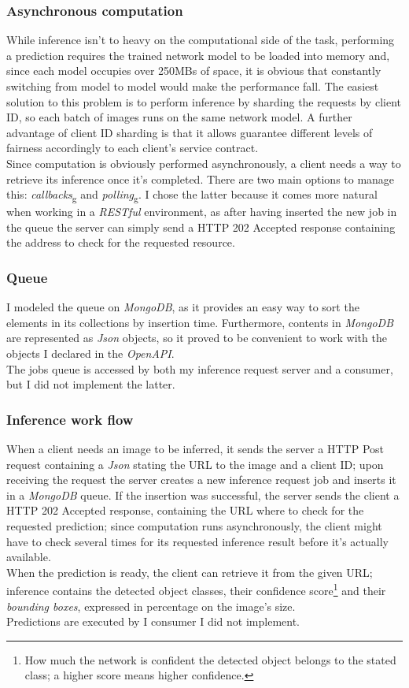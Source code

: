\subsubsection{Asynchronous computation}
While inference isn't to heavy on the computational side of the task, performing a prediction requires the trained network model to be loaded into memory and, since each model occupies over 250MBs of space, it is obvious that constantly switching from model to model would make the performance fall. The easiest solution to this problem is to perform inference by sharding the requests by client ID, so each batch of images runs on the same network model. A further advantage of client ID sharding is that it allows guarantee different levels of fairness accordingly to each client's service contract. \\
Since computation is obviously performed asynchronously, a client needs a way to retrieve its inference once it's completed. There are two main options to manage this: \emph{\gls{callback}s}\textsubscript{g} and \emph{\gls{polling}}\textsubscript{g}. I chose the latter because it comes more natural when working in a \emph{RESTful} environment, as after having inserted the new job in the queue the server can simply send a HTTP 202 Accepted response containing the address to check for the requested resource.

\subsubsection{Queue}
I modeled the queue on \emph{MongoDB}, as it provides an easy way to sort the elements in its collections by insertion time. Furthermore, contents in \emph{MongoDB} are represented as \emph{Json} objects, so it proved to be convenient to work with the objects I declared in the \emph{OpenAPI}. \\
The jobs queue is accessed by both my inference request server and a consumer, but I did not implement the latter.

\subsubsection{Inference work flow}
When a client needs an image to be inferred, it sends the server a HTTP Post request containing a \emph{Json} stating the URL to the image and a client ID; upon receiving the request the server creates a new inference request job and inserts it in a \emph{MongoDB} queue. If the insertion was successful, the server sends the client a HTTP 202 Accepted response, containing the URL where to check for the requested prediction; since computation runs asynchronously, the client might have to check several times for its requested inference result before it's actually available. \\
When the prediction is ready, the client can retrieve it from the given URL; inference contains the detected object classes, their confidence score\footnote{How much the network is confident the detected object belongs to the stated class; a higher score means higher confidence.} and their \emph{bounding boxes}, expressed in percentage on the image's size. \\
Predictions are executed by I consumer I did not implement.

